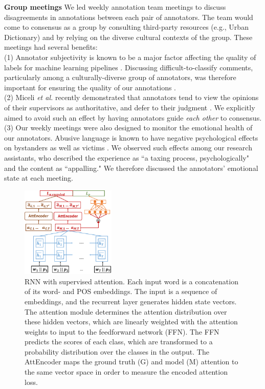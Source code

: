 \documentclass[letterpaper]{article}
\begin{document}
\noindent\textbf{Group meetings}
We led weekly annotation team meetings to discuss disagreements in annotations between each pair of annotators.
The team would come to consensus as a group by consulting third-party resources (e.g., Urban Dictionary) and by relying on the diverse cultural contexts of the group.
These meetings had several benefits: \\
(1) Annotator subjectivity is known to be a major factor affecting the quality of labels for machine learning pipelines \cite{hube2019understanding}.
Discussing difficult-to-classify comments, particularly among a culturally-diverse group of annotators, was therefore important for ensuring the quality of our annotations \cite{vidgen2019challenges}. \\
\noindent (2) Miceli \textit{et al.} recently demonstrated that annotators tend to view the opinions of their supervisors as authoritative, and defer to their judgment  \cite{miceli2020between}.
We explicitly aimed to avoid such an effect by having annotators guide \textit{each other} to consensus. \\
(3) Our weekly meetings were also designed to monitor the emotional health of our annotators.
Abusive language is known  to have negative psychological effects on bystanders as well as victims \cite{low2007experiences,ferguson2011know}.
We observed such effects among our research assistants, who described the experience as ``a taxing process, psychologically" and the content as ``appalling."
We therefore discussed the annotators' emotional state at each meeting.

\begin{figure}[h!]
\captionsetup{font=normalsize}
\centering
\includegraphics[width=0.4\textwidth]{model.pdf}
\caption{RNN with supervised attention. Each input word is a concatenation of its word- and POS embeddings. The input is a sequence of embeddings, and the recurrent layer generates hidden state vectors. The attention module determines the attention distribution over these hidden vectors, which are linearly weighted with the attention weights to  input to the feedforward network (FFN). The FFN  predicts the scores of each class, which are transformed to a probability distribution over the classes in the output. The AttEncoder maps the ground truth (G) and model (M) attention to the same vector space in order to measure the encoded attention loss.}
\label{rnn_supervised_attetnion}
\end{figure}
\end{document}
